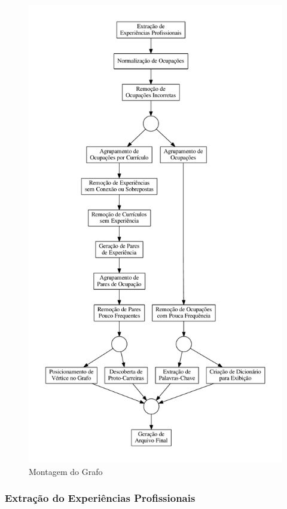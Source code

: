 \documentclass[12pt,a4paper]{article}
\theoremstyle{hypo}
\begin{document}
\begin{figure}[ht]
  \centering
  \includegraphics[scale=0.4]{pipeline1.pdf}
  \caption{Montagem do Grafo}
  \label{fig:montagem-do-grafo}
\end{figure}

\subsubsection{Extração do Experiências Profissionais} \label{sec:extracao-experiencia}
\end{document}
